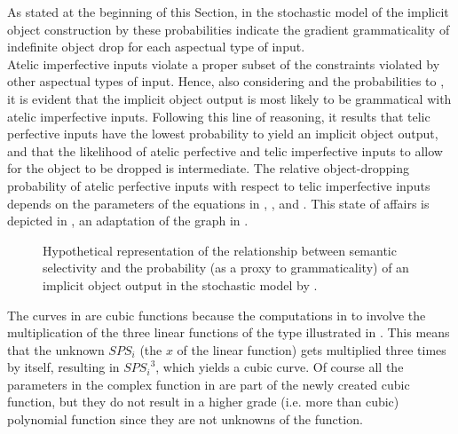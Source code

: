 As stated at the beginning of this Section, in the stochastic model of the implicit object construction by \textcite{Medina2007} these probabilities indicate the gradient grammaticality of indefinite object drop for each aspectual type of input.\\
Atelic imperfective inputs violate a proper subset of the constraints violated by other aspectual types of input. Hence, also considering  and the probabilities  to , it is evident that the implicit object output is most likely to be grammatical with atelic imperfective inputs. Following this line of reasoning, it results that telic perfective inputs have the lowest probability to yield an implicit object output, and that the likelihood of atelic perfective and telic imperfective inputs to allow for the object to be dropped is intermediate. The relative object-dropping probability of atelic perfective inputs with respect to telic imperfective inputs depends on the parameters of the equations in , , and . This state of affairs is depicted in , an adaptation of the graph in \textcite[108]{Medina2007}.

\begin{figure}[htb]
\caption{Hypothetical representation of the relationship between semantic selectivity and the probability (as a proxy to grammaticality) of an implicit object output in the stochastic model by \textcite{Medina2007}. }
\end{figure}

The curves in  are cubic functions because the computations in   to  involve the multiplication of the three linear functions of the type illustrated in . This means that the unknown $SPS_i$ (the $x$ of the linear function) gets multiplied three times by itself, resulting in ${SPS_i}^3$, which yields a cubic curve. Of course all the parameters in the complex function in  are part of the newly created cubic function, but they do not result in a higher grade (i.e. more than cubic) polynomial function since they are not unknowns of the function.

